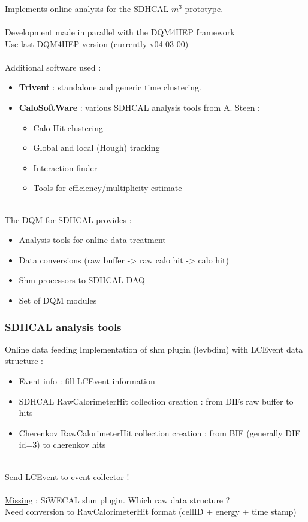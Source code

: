 \documentclass[8pt]{beamer}
\begin{document}
  \begin{frame}
    \frametitle{\secname}
    Implements online analysis for the SDHCAL $m^3$ prototype. \\
    ~ \\
    Development made in parallel with the DQM4HEP framework \\
    Use last DQM4HEP version (currently v04-03-00) \\
    ~ \\
    Additional software used : 
    \begin{itemize}
      \item \textbf{Trivent} : standalone and generic time clustering.
      \item \textbf{CaloSoftWare} : various SDHCAL analysis tools from A. Steen :
      \begin{itemize}
        \item Calo Hit clustering
        \item Global and local (Hough) tracking
        \item Interaction finder
        \item Tools for efficiency/multiplicity estimate
      \end{itemize}
    \end{itemize}
    ~ \\
    The DQM for SDHCAL provides :
    \begin{itemize}
      \item Analysis tools for online data treatment
      \item Data conversions (raw buffer -> raw calo hit -> calo hit)
      \item Shm processors to SDHCAL DAQ
      \item Set of DQM modules
    \end{itemize}
  \end{frame}
  
  
  \begin{frame}
    \frametitle{\secname}
    \frametitle{SDHCAL analysis tools}
    \begin{block}{Online data feeding}
    Implementation of shm plugin (levbdim) with LCEvent data structure :
      \begin{itemize}
        \item Event info : fill LCEvent information
        \item SDHCAL RawCalorimeterHit collection creation : from DIFs raw buffer to hits
        \item Cherenkov RawCalorimeterHit collection creation : from BIF (generally DIF id=3) to cherenkov hits
      \end{itemize}
    \end{block}
    ~ \\
    Send LCEvent to event collector ! \\
    ~ \\
    \underline{Missing} : SiWECAL shm plugin. Which raw data structure ? \\
    Need conversion to RawCalorimeterHit format (cellID + energy + time stamp)
  \end{frame}
  
\end{document}
